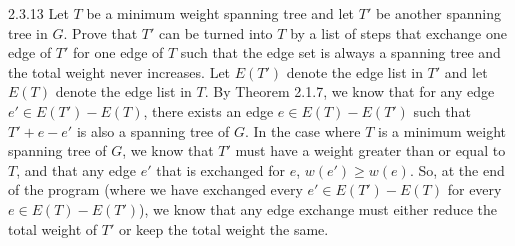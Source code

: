 \documentclass[10pt]{extarticle}
\begin{document}
  \begin{problem}{2.3.13}
    Let $T$ be a minimum weight spanning tree and let $T'$ be another spanning tree in $G$. Prove that $T'$ can be turned into $T$ by a list of steps that exchange one edge of $T'$ for one edge of $T$ such that the edge set is always a spanning tree and the total weight never increases.
    \tcblower
    Let $E(T')$ denote the edge list in $T'$ and let $E(T)$ denote the edge list in $T$. By Theorem 2.1.7, we know that for any edge $e'\in E(T') - E(T)$, there exists an edge $e\in E(T) - E(T')$ such that $T'+ e - e'$ is also a spanning tree of $G$. In the case where $T$ is a minimum weight spanning tree of $G$, we know that $T'$ must have a weight greater than or equal to $T$, and that any edge $e'$ that is exchanged for $e$, $w(e') \geq w(e)$. So, at the end of the program (where we have exchanged every $e'\in E(T') - E(T)$ for every $e\in E(T) - E(T')$), we know that any edge exchange must either reduce the total weight of $T'$ or keep the total weight the same.
  \end{problem}
\end{document}
